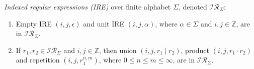 \documentclass[AMA,STIX1COL]{WileyNJD-v2}
\newcommand{\XI}{\mathcal{I}}
\newcommand{\XIR}{\XI\!\XR}
\newcommand{\XR}{\mathcal{R}}
\newcommand{\YZ}{\mathbb{Z}}
\begin{document}
    \begin{definition}
    \emph{Indexed regular expressions (IRE)} over finite alphabet $\Sigma$, denoted $\XIR_\Sigma$:
    \begin{enumerate}
        \item
          Empty IRE $(i, j, \epsilon)$ and
          unit IRE $(i, j, \alpha)$, where $\alpha \in \Sigma$ and $i, j \in \YZ$,
          are in $\XIR_\Sigma$.

        \item If $r_1, r_2 \in \XIR_\Sigma$ and $i, j \in \YZ$, then
          union $(i, j, r_1 \mid r_2)$,
          product $(i, j, r_1 \cdot r_2)$ and
          repetition $(i, j, r_1^{n, m})$, where $0 \leq n \leq m \leq \infty$,
          are in $\XIR_\Sigma$.
    \end{enumerate}
    \end{definition}
\end{document}
